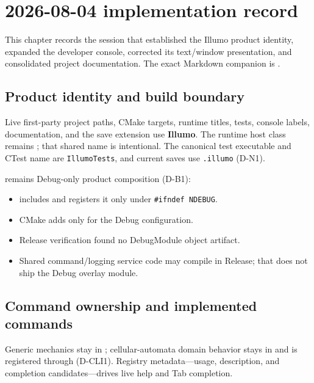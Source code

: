 \section{2026-08-04 implementation record}
\label{sec:session-2026-08-04}

This chapter records the session that established the Illumo product identity,
expanded the developer console, corrected its text/window presentation, and
consolidated project documentation. The exact Markdown companion is
.

\subsection{Product identity and build boundary}

Live first-party project paths, CMake targets, runtime titles, tests, console
labels, documentation, and the save extension use \textbf{Illumo}. The runtime
host class remains ; that shared name is intentional. The
canonical test executable and CTest name are \texttt{IllumoTests}, and current
saves use \texttt{.illumo} (D-N1).

 remains Debug-only product composition (D-B1):
\begin{itemize}
  \item {} includes and registers it only under
        \texttt{\#ifndef NDEBUG}.
  \item CMake adds  only for the Debug configuration.
  \item Release verification found no DebugModule object artifact.
  \item Shared command/logging service code may compile in Release; that does
        not ship the Debug overlay module.
\end{itemize}

\subsection{Command ownership and implemented commands}

Generic mechanics stay in ; cellular-automata domain
behavior stays in  and is registered through
 (D-CLI1). Registry metadata---usage, description,
and completion candidates---drives live help and Tab completion.

